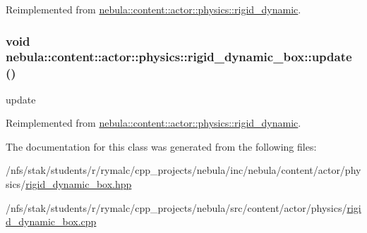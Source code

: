 Reimplemented from \hyperlink{classnebula_1_1content_1_1actor_1_1physics_1_1rigid__dynamic_a23e957b179440185cfc15750b47f3a5c}{nebula::content::actor::physics::rigid\_\-dynamic}.\hypertarget{classnebula_1_1content_1_1actor_1_1physics_1_1rigid__dynamic__box_ac3f90a5c975d090930fb77f5961e7064}{
\subsubsection[{update}]{\setlength{\rightskip}{0pt plus 5cm}void nebula::content::actor::physics::rigid\_\-dynamic\_\-box::update ()}}
\label{classnebula_1_1content_1_1actor_1_1physics_1_1rigid__dynamic__box_ac3f90a5c975d090930fb77f5961e7064}


update 

Reimplemented from \hyperlink{classnebula_1_1content_1_1actor_1_1physics_1_1rigid__dynamic_a37baf9ed4986782294789073ebb05f19}{nebula::content::actor::physics::rigid\_\-dynamic}.

The documentation for this class was generated from the following files:\begin{DoxyCompactItemize}
\item 
/nfs/stak/students/r/rymalc/cpp\_\-projects/nebula/inc/nebula/content/actor/physics/\hyperlink{physics_2rigid__dynamic__box_8hpp}{rigid\_\-dynamic\_\-box.hpp}\item 
/nfs/stak/students/r/rymalc/cpp\_\-projects/nebula/src/content/actor/physics/\hyperlink{physics_2rigid__dynamic__box_8cpp}{rigid\_\-dynamic\_\-box.cpp}\end{DoxyCompactItemize}
